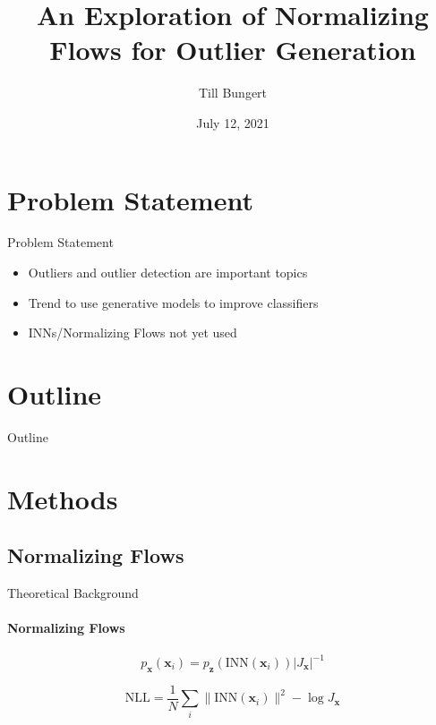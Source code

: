 \documentclass[aspectratio=169]{beamer}
\title{An Exploration of Normalizing Flows for Outlier Generation}
\author{Till Bungert}
\date{July 12, 2021}
\begin{document}
\showthe\textwidth

\begin{frame}[c]
\titlepage
\end{frame}


\section*{Problem Statement}
\begin{frame}{Problem Statement}
    \begin{itemize}
        \item Outliers and outlier detection are important topics
        \item Trend to use generative models to improve classifiers
        \item INNs/Normalizing Flows not yet used
    \end{itemize}
\end{frame}

\section*{Outline}

\begin{frame}{Outline}
\tableofcontents
\end{frame}


\section{Methods}

\subsection{Normalizing Flows}

\begin{frame}{Theoretical Background}
    \framesubtitle{Normalizing Flows}
\begin{equation}%
    \label{eq:change_of_variables}
    p_{\mathbf{x}}(\mathbf{x}_i) =
    p_{\mathbf{z}}(\mathrm{INN}(\mathbf{x}_i)) \lvert J_{\mathbf{x}} \rvert^{-1}
\end{equation}

\begin{equation}%
    \label{eq:nll_loss}
    \mathrm{NLL} = \frac{1}{N} \sum_i \lVert \mathrm{INN} (\mathbf{x}_i) \rVert^2 - \log J_{\mathbf{x}}
\end{equation}
\end{frame}
\end{document}
